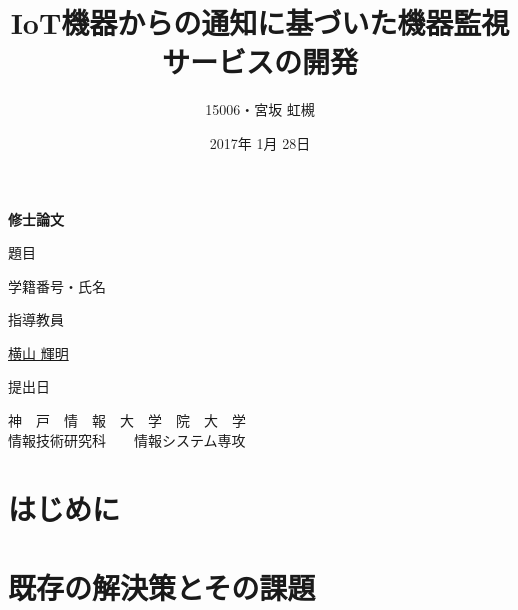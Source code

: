 \documentclass[a4paper]{jreport}
\begin{document}
\makeatletter

\title{IoT機器からの通知に基づいた機器監視サービスの開発}
\author{15006・宮坂 虹槻}
\date{2017年 1月 28日}
\def\@teacher{横山 輝明}

\begin{titlepage}\begin{center}
\thispagestyle{plain}
{\Huge \textbf{修士論文} \par}
\vspace{1.5cm}
{\LARGE\gt 題目 \par}
{\LARGE\gt \underline{\@title} \par}
\vspace{2.5cm}
{\LARGE\gt 学籍番号・氏名 \par}
\vspace{1.5cm}
{\LARGE \underline{\@author} \par}
\vspace{1.5cm}
{\LARGE\gt 指導教員 \par}
\vspace{1.5cm}
{\LARGE\gt \underline{\@teacher} \par}
\vspace{1.5cm}
{\LARGE\gt 提出日 \par}
\vspace{1.5cm}
{\LARGE\gt \underline{\@date} \par}
\vspace{1.5cm}
{\Large\gt
神　戸　情　報　大　学　院　大　学\\
情報技術研究科　　情報システム専攻\\
\par}
\end{center}\end{titlepage}
\restoregeometry
\makeatother

\tableofcontents

\begin{abstract}
\thispagestyle{plain}

\end{abstract}

\chapter{はじめに}


\chapter{既存の解決策とその課題}

\end{document}

